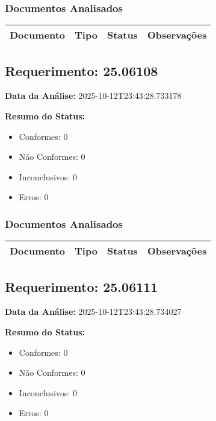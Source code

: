 \documentclass[12pt,a4paper]{article}
\begin{document}
\subsubsection{Documentos Analisados}

\begin{longtable}{|p{4cm}|p{2cm}|p{2cm}|p{6cm}|}
\hline
\textbf{Documento} & \textbf{Tipo} & \textbf{Status} & \textbf{Observações} \\
\hline
\endhead
\end{longtable}


\subsection{Requerimento: 25.06108}

\textbf{Data da Análise:} 2025-10-12T23:43:28.733178

\textbf{Resumo do Status:}
\begin{itemize}
    \item Conformes: 0
    \item Não Conformes: 0
    \item Inconclusivos: 0
    \item Erros: 0
\end{itemize}

\subsubsection{Documentos Analisados}

\begin{longtable}{|p{4cm}|p{2cm}|p{2cm}|p{6cm}|}
\hline
\textbf{Documento} & \textbf{Tipo} & \textbf{Status} & \textbf{Observações} \\
\hline
\endhead
\end{longtable}


\subsection{Requerimento: 25.06111}

\textbf{Data da Análise:} 2025-10-12T23:43:28.734027

\textbf{Resumo do Status:}
\begin{itemize}
    \item Conformes: 0
    \item Não Conformes: 0
    \item Inconclusivos: 0
    \item Erros: 0
\end{itemize}
\end{document}
